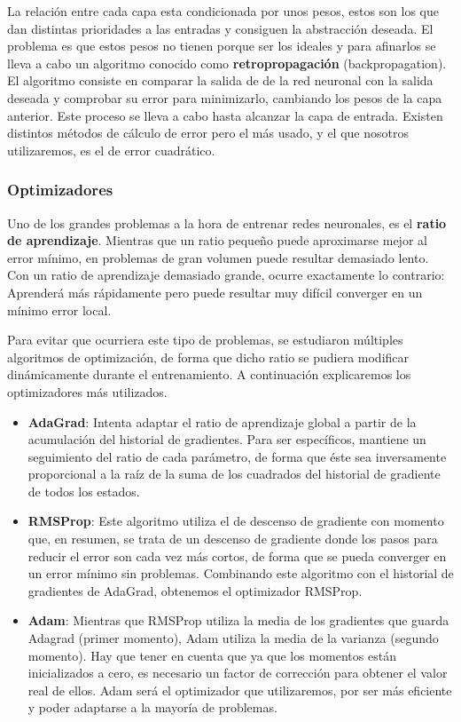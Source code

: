 La relación entre cada capa esta condicionada por unos pesos, estos son los que dan distintas prioridades a las entradas y consiguen la abstracción deseada. El problema es que estos pesos no tienen porque ser los ideales y para afinarlos se lleva a cabo un algoritmo conocido como \textbf{retropropagación} (backpropagation). El algoritmo consiste en comparar la salida de de la red neuronal con la salida deseada y comprobar su error para minimizarlo, cambiando los pesos de la capa anterior. Este proceso se lleva a cabo hasta alcanzar la capa de entrada. Existen distintos métodos de cálculo de error pero el más usado, y el que nosotros utilizaremos, es el de error cuadrático.\\

\subsubsection{Optimizadores}
Uno de los grandes problemas a la hora de entrenar redes neuronales, es el \textbf{ratio de aprendizaje}. Mientras que un ratio pequeño puede aproximarse mejor al error mínimo, en problemas de gran volumen puede resultar demasiado lento. Con un ratio de aprendizaje demasiado grande, ocurre exactamente lo contrario: Aprenderá más rápidamente pero puede resultar muy difícil converger en un mínimo error local.

Para evitar que ocurriera este tipo de problemas, se estudiaron múltiples algoritmos de optimización, de forma que dicho ratio se pudiera modificar dinámicamente durante el entrenamiento. A continuación explicaremos los optimizadores más utilizados.

\begin{itemize}
    \item \textbf{AdaGrad}: Intenta adaptar el ratio de aprendizaje global a partir de la acumulación del historial de gradientes. Para ser específicos, mantiene un seguimiento del ratio de cada parámetro, de forma que éste sea inversamente proporcional a la raíz de la suma de los cuadrados del historial de gradiente de todos los estados. 
    \item \textbf{RMSProp}: Este algoritmo utiliza el de descenso de gradiente con momento que, en resumen, se trata de un descenso de gradiente donde los pasos para reducir el error son cada vez más cortos, de forma que se pueda converger en un error mínimo sin problemas. Combinando este algoritmo con el historial de gradientes de AdaGrad, obtenemos el optimizador RMSProp. 
    \item \textbf{Adam}: Mientras que RMSProp utiliza la media de los gradientes que guarda Adagrad (primer momento), Adam utiliza la media de la varianza (segundo momento). Hay que tener en cuenta que ya que los momentos están inicializados a cero, es necesario un factor de corrección para obtener el valor real de ellos. Adam será el optimizador que utilizaremos, por ser más eficiente y poder adaptarse a la mayoría de problemas. 
\end{itemize}

